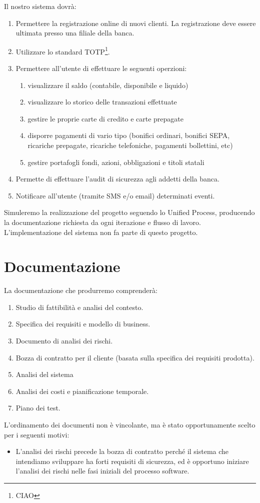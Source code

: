 \documentclass[]{softeng}
\begin{document}
Il nostro sistema dovr\`a:
\begin{enumerate}
	\item Permettere la registrazione online di nuovi clienti.
		La registrazione deve essere ultimata presso una filiale della banca.
	\item Utilizzare lo standard TOTP\footnote{CIAO}.
	\item Permettere all'utente di effettuare le seguenti operzioni:
		\begin{enumerate}
			\item visualizzare il saldo (contabile, disponibile e liquido)
			\item visualizzare lo storico delle transazioni effettuate
			\item gestire le proprie carte di credito e carte prepagate
			\item disporre pagamenti di vario tipo (bonifici ordinari, bonifici SEPA, ricariche prepagate, ricariche telefoniche, pagamenti bollettini, etc)
			\item gestire portafogli fondi, azioni, obbligazioni e titoli statali %
		\end{enumerate}
	\item Permette di effettuare l'audit di sicurezza agli addetti della banca.
	\item Notificare all'utente (tramite SMS e/o email) determinati eventi.
\end{enumerate}

Simuleremo la realizzazione del progetto seguendo lo Unified Process, producendo la documentazione richiesta da ogni iterazione e flusso di lavoro.
L'implementazione del sistema non fa parte di questo progetto.

\section{Documentazione}

La documentazione che produrremo comprender\`a:
\begin{enumerate}
	\item Studio di fattibilit\`a e analisi del contesto.
	\item Specifica dei requisiti e modello di business.
	\item Documento di analisi dei rischi.
	\item Bozza di contratto per il cliente (basata sulla specifica dei requisiti prodotta).
	\item Analisi del sistema %
	\item Analisi dei costi e pianificazione temporale.
	\item Piano dei test.
\end{enumerate}
L'ordinamento dei documenti non \`e vincolante, ma \`e stato opportunamente scelto per i seguenti motivi:
\begin{itemize}
	\item L'analisi dei rischi precede la bozza di contratto perch\'e il sistema che intendiamo sviluppare ha forti requisiti di sicurezza, ed \`e opportuno iniziare l'analisi dei rischi nelle fasi iniziali del processo software.
\end{itemize}
\end{document}
